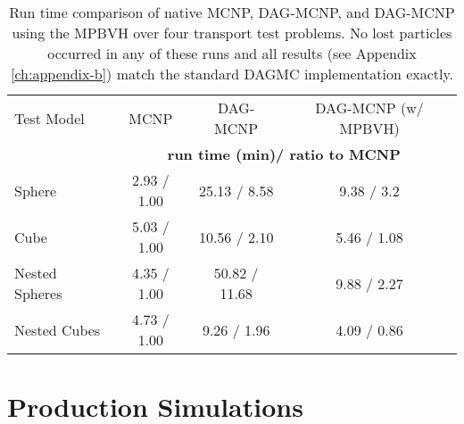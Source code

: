 \begin{table}[H]
  \small
  \begin{center}
    \begin{tabular}{lccc}

      \toprule
      Test Model & MCNP & DAG-MCNP & DAG-MCNP (w/ MPBVH) \\
      & \multicolumn{3}{c}{\textbf{run time (min)/ ratio to MCNP}} \\
      \hline
      Sphere         & 2.93 / 1.00 & 25.13 / 8.58  & 9.38 / 3.2  \\
      Cube           & 5.03 / 1.00 & 10.56 / 2.10 & 5.46 / 1.08 \\
      Nested Spheres & 4.35 / 1.00  & 50.82 / 11.68  & 9.88 / 2.27 \\
      Nested Cubes   & 4.73 / 1.00 & 9.26 / 1.96 & 4.09 / 0.86 \\
      \bottomrule
    \end{tabular}
  \end{center}
  \caption[Performance results for simple DAG-MCNP test cases.]{Run time
    comparison of native MCNP, DAG-MCNP, and DAG-MCNP using the MPBVH over four
    transport test problems. No lost particles occurred in any of these runs and
    all results (see Appendix \ref{ch:appendix-b}) match the standard DAGMC
    implementation exactly.}
  \label{tab:mpbvh_transport_timing_simple}
\end{table}

\section{Production Simulations}\label{subsec:mpbvh_production_transport}

